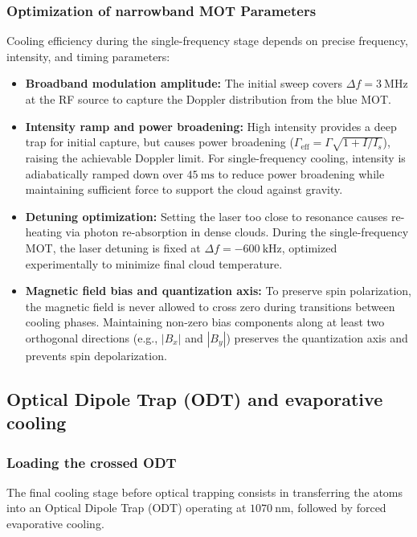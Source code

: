\subsubsection{Optimization of narrowband MOT Parameters}

Cooling efficiency during the single-frequency stage depends on precise frequency, intensity, and timing parameters:
\begin{itemize}
    \item \textbf{Broadband modulation amplitude:} The initial sweep covers $\Delta f = 3~\text{MHz}$ at the RF source to capture the Doppler distribution from the blue MOT.
    
    \item \textbf{Intensity ramp and power broadening:} High intensity provides a deep trap for initial capture, but causes power broadening ($\Gamma_{\text{eff}} = \Gamma \sqrt{1 + I/I_s}$), raising the achievable Doppler limit. For single-frequency cooling, intensity is adiabatically ramped down over $45~\text{ms}$ to reduce power broadening while maintaining sufficient force to support the cloud against gravity.
    
    \item \textbf{Detuning optimization:} Setting the laser too close to resonance causes re-heating via photon re-absorption in dense clouds. During the single-frequency MOT, the laser detuning is fixed at $\Delta f = -600~\text{kHz}$, optimized experimentally to minimize final cloud temperature.
    
    \item \textbf{Magnetic field bias and quantization axis:} To preserve spin polarization, the magnetic field is never allowed to cross zero during transitions between cooling phases. Maintaining non-zero bias components along at least two orthogonal directions (e.g., $|B_x|$ and $|B_y|$) preserves the quantization axis and prevents spin depolarization.
\end{itemize}

\subsection{Optical Dipole Trap (ODT) and evaporative cooling}

\subsubsection{Loading the crossed ODT}
The final cooling stage before optical trapping consists in transferring the atoms into an Optical Dipole Trap (ODT) operating at $1070~\text{nm}$, followed by forced evaporative cooling.

